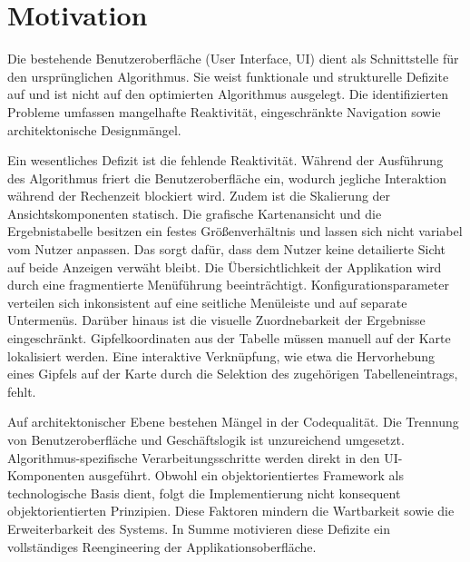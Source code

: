 \section{Motivation} \label{sec:motivation_reengineering_gui}
Die bestehende Benutzeroberfläche (User Interface, UI)  dient als Schnittstelle für den ursprünglichen Algorithmus. Sie weist funktionale und strukturelle Defizite auf und ist nicht auf den optimierten Algorithmus ausgelegt. Die identifizierten Probleme umfassen mangelhafte Reaktivität, eingeschränkte Navigation sowie architektonische Designmängel.

Ein wesentliches Defizit ist die fehlende Reaktivität. Während der Ausführung des Algorithmus friert die Benutzeroberfläche ein, wodurch jegliche Interaktion während der Rechenzeit blockiert wird. Zudem ist die Skalierung der Ansichtskomponenten statisch. Die grafische Kartenansicht und die Ergebnistabelle besitzen ein festes Größenverhältnis und lassen sich nicht variabel vom Nutzer anpassen. Das sorgt dafür, dass dem Nutzer keine detailierte Sicht auf beide Anzeigen verwäht bleibt. Die Übersichtlichkeit der Applikation wird durch eine fragmentierte Menüführung beeinträchtigt. Konfigurationsparameter verteilen sich inkonsistent auf eine seitliche Menüleiste und auf separate Untermenüs. Darüber hinaus ist die visuelle Zuordnebarkeit der Ergebnisse eingeschränkt. Gipfelkoordinaten aus der Tabelle müssen manuell auf der Karte lokalisiert werden. Eine interaktive Verknüpfung, wie etwa die Hervorhebung eines Gipfels auf der Karte durch die Selektion des zugehörigen Tabelleneintrags, fehlt.

Auf architektonischer Ebene bestehen Mängel in der Codequalität. Die Trennung von Benutzeroberfläche und Geschäftslogik ist unzureichend umgesetzt. Algorithmus-spezifische Verarbeitungsschritte werden direkt in den UI-Komponenten ausgeführt. Obwohl ein objektorientiertes Framework als technologische Basis dient, folgt die Implementierung nicht konsequent objektorientierten Prinzipien. Diese Faktoren mindern die Wartbarkeit sowie die Erweiterbarkeit des Systems. In Summe motivieren diese Defizite ein vollständiges Reengineering der Applikationsoberfläche.
